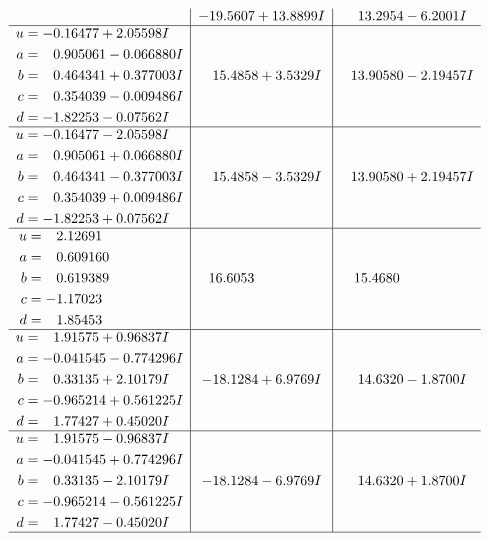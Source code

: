 \documentclass[1p]{elsarticle_modified}
\theoremstyle{definition}
\begin{document}
$$\begin{array}{c|c|c}
 & -19.5607 + 13.8899 I & \phantom{-}13.2954 - 6.2001 I \\ \hline\begin{aligned}
u &= -0.16477 + 2.05598 I \\
a &= \phantom{-}0.905061 - 0.066880 I \\
b &= \phantom{-}0.464341 + 0.377003 I \\
c &= \phantom{-}0.354039 - 0.009486 I \\
d &= -1.82253 - 0.07562 I\end{aligned}
 & \phantom{-}15.4858 + 3.5329 I & \phantom{-}13.90580 - 2.19457 I \\ \hline\begin{aligned}
u &= -0.16477 - 2.05598 I \\
a &= \phantom{-}0.905061 + 0.066880 I \\
b &= \phantom{-}0.464341 - 0.377003 I \\
c &= \phantom{-}0.354039 + 0.009486 I \\
d &= -1.82253 + 0.07562 I\end{aligned}
 & \phantom{-}15.4858 - 3.5329 I & \phantom{-}13.90580 + 2.19457 I \\ \hline\begin{aligned}
u &= \phantom{-}2.12691\phantom{ +0.000000I} \\
a &= \phantom{-}0.609160\phantom{ +0.000000I} \\
b &= \phantom{-}0.619389\phantom{ +0.000000I} \\
c &= -1.17023\phantom{ +0.000000I} \\
d &= \phantom{-}1.85453\phantom{ +0.000000I}\end{aligned}
 & \phantom{-}16.6053\phantom{ +0.000000I} & \phantom{-}15.4680\phantom{ +0.000000I} \\ \hline\begin{aligned}
u &= \phantom{-}1.91575 + 0.96837 I \\
a &= -0.041545 - 0.774296 I \\
b &= \phantom{-}0.33135 + 2.10179 I \\
c &= -0.965214 + 0.561225 I \\
d &= \phantom{-}1.77427 + 0.45020 I\end{aligned}
 & -18.1284 + 6.9769 I & \phantom{-}14.6320 - 1.8700 I \\ \hline\begin{aligned}
u &= \phantom{-}1.91575 - 0.96837 I \\
a &= -0.041545 + 0.774296 I \\
b &= \phantom{-}0.33135 - 2.10179 I \\
c &= -0.965214 - 0.561225 I \\
d &= \phantom{-}1.77427 - 0.45020 I\end{aligned}
 & -18.1284 - 6.9769 I & \phantom{-}14.6320 + 1.8700 I\\
 \hline 
 \end{array}$$\newpage\newpage\renewcommand{\arraystretch}{1}
\end{document}
